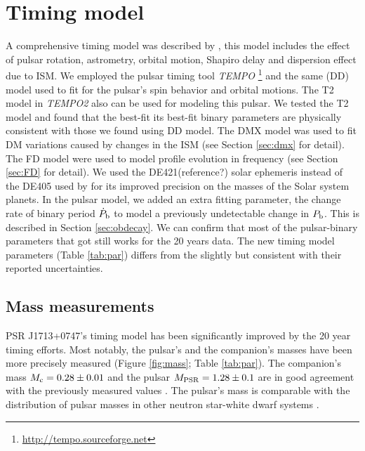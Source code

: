 \section{Timing model}
\label{sec:model}
A comprehensive timing model was described by \citet{sns+05}, this model includes the effect of pulsar rotation, astrometry, orbital motion, Shapiro delay and dispersion effect due to ISM.
We employed the pulsar timing tool \textit{TEMPO} \footnote{\url{http://tempo.sourceforge.net}} and the same \citet{dd86} (DD) model \citet{sns+05} used to fit for the pulsar's spin behavior and orbital motions. 
The T2 model \citep{??} in \textit{TEMPO2} \citep{hem06} also can be used for modeling this pulsar. We tested the T2 model and found that the best-fit its best-fit binary parameters are physically consistent with those we found using DD model.
The DMX model was used to fit DM variations caused by changes in the ISM (see Section \ref{sec:dmx} for detail). The FD model were used to model profile
evolution in frequency (see Section \ref{sec:FD} for detail). 
We used the DE421(reference?) solar ephemeris instead of the DE405 used by
\citet{sns+05} for its improved precision on the masses of the Solar system planets. 
In the pulsar model, we added an extra fitting parameter, the change rate of binary period $\dot{P}_{\rm b}$ to model a previously undetectable change in $P_{\rm b}$. This is described in Section \ref{sec:obdecay}.    
We can confirm that most of the pulsar-binary parameters that \citet{sns+05} got still works for the 20 years data. The new timing model parameters (Table \ref{tab:par}) differs from the \citet{sns+05} slightly but consistent with their reported uncertainties.



\subsection{Mass measurements}
\label{sec:mass}
PSR J1713+0747's timing model has been significantly improved by the 20 year timing efforts.
Most
notably, the pulsar's and the companion's masses have been more precisely measured
(Figure \ref{fig:mass}; Table \ref{tab:par}). The
companion's mass $M_{\rm c} = 0.28\pm0.01$ and the pulsar $M_{\rm PSR}=1.28\pm0.1$ are in good agreement with the previously measured values \cite{sns+05}.
The pulsar's mass is comparable with the distribution of pulsar masses in other neutron star-white dwarf systems \citep{tc99, kkdt13}.


